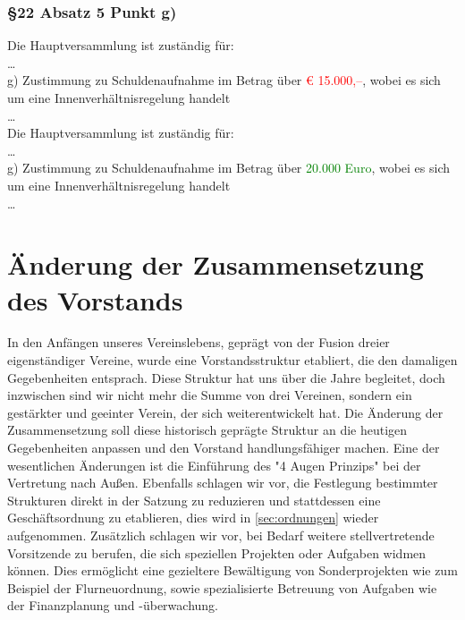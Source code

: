 \documentclass[10pt,a4paper,parskip=half]{scrartcl}
\newcommand{\new}[1]{\textcolor{Green}{#1}}
\newcommand{\old}[1]{\textcolor{Red}{#1}}
\newcommand{\change}[1]{
  \begin{adjustwidth}{20pt}{20pt}
    #1
  \end{adjustwidth}
}
\newcommand{\compare}[3]{\change{\subsubsection*{#1}\begin{multicols}{2}#2\columnbreak\\#3\end{multicols}}}
\begin{document}
  \compare{§22 Absatz 5 Punkt g)}
  {Die Hauptversammlung ist zuständig für: \\ \dots\\g) Zustimmung zu Schuldenaufnahme im Betrag über \old{€ 15.000,--}, wobei es sich um eine Innenverhältnisregelung handelt\\\dots}
  {Die Hauptversammlung ist zuständig für: \\ \dots\\g) Zustimmung zu Schuldenaufnahme im Betrag über \new{20.000 Euro}, wobei es sich um eine Innenverhältnisregelung handelt\\\dots}

  \clearpage
  \section{Änderung der Zusammensetzung des Vorstands}
  \label{sec:vorstand}
  In den Anfängen unseres Vereinslebens, geprägt von der Fusion dreier eigenständiger Vereine, wurde eine Vorstandsstruktur etabliert, die den damaligen Gegebenheiten entsprach. Diese Struktur hat uns über die Jahre begleitet, doch inzwischen sind wir nicht mehr die Summe von drei Vereinen, sondern ein gestärkter und geeinter Verein, der sich weiterentwickelt hat.
  Die Änderung der Zusammensetzung soll diese historisch geprägte Struktur an die heutigen Gegebenheiten anpassen und den Vorstand handlungsfähiger machen. Eine der wesentlichen Änderungen ist die Einführung des "4 Augen Prinzips" bei der Vertretung nach Außen. Ebenfalls schlagen wir vor, die Festlegung bestimmter Strukturen direkt in der Satzung zu reduzieren und stattdessen eine Geschäftsordnung zu etablieren, dies wird in \autoref{sec:ordnungen} wieder aufgenommen. Zusätzlich schlagen wir vor, bei Bedarf weitere stellvertretende Vorsitzende zu berufen, die sich speziellen Projekten oder Aufgaben widmen können. Dies ermöglicht eine gezieltere Bewältigung von Sonderprojekten wie zum Beispiel der Flurneuordnung, sowie spezialisierte Betreuung von Aufgaben wie der Finanzplanung und -überwachung. 
\end{document}
